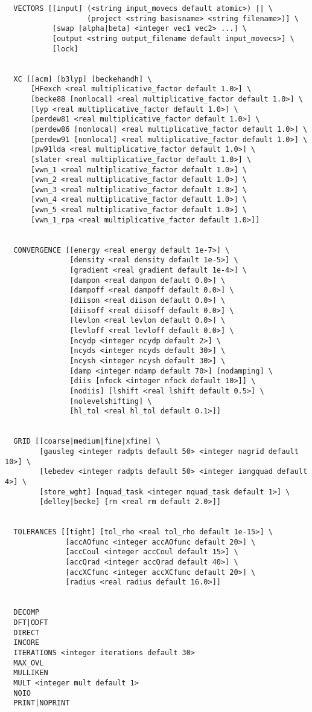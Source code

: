 \begin{verbatim}
  VECTORS [[input] (<string input_movecs default atomic>) || \
                   (project <string basisname> <string filename>)] \
           [swap [alpha|beta] <integer vec1 vec2> ...] \
           [output <string output_filename default input_movecs>] \
           [lock]


  XC [[acm] [b3lyp] [beckehandh] \
      [HFexch <real multiplicative_factor default 1.0>] \
      [becke88 [nonlocal] <real multiplicative_factor default 1.0>] \
      [lyp <real multiplicative_factor default 1.0>] \
      [perdew81 <real multiplicative_factor default 1.0>] \
      [perdew86 [nonlocal] <real multiplicative_factor default 1.0>] \
      [perdew91 [nonlocal] <real multiplicative_factor default 1.0>] \
      [pw91lda <real multiplicative_factor default 1.0>] \
      [slater <real multiplicative_factor default 1.0>] \
      [vwn_1 <real multiplicative_factor default 1.0>] \
      [vwn_2 <real multiplicative_factor default 1.0>] \
      [vwn_3 <real multiplicative_factor default 1.0>] \
      [vwn_4 <real multiplicative_factor default 1.0>] \
      [vwn_5 <real multiplicative_factor default 1.0>] \
      [vwn_1_rpa <real multiplicative_factor default 1.0>]]


  CONVERGENCE [[energy <real energy default 1e-7>] \
               [density <real density default 1e-5>] \
               [gradient <real gradient default 1e-4>] \
               [dampon <real dampon default 0.0>] \
               [dampoff <real dampoff default 0.0>] \
               [diison <real diison default 0.0>] \
               [diisoff <real diisoff default 0.0>] \
               [levlon <real levlon default 0.0>] \
               [levloff <real levloff default 0.0>] \
               [ncydp <integer ncydp default 2>] \
               [ncyds <integer ncyds default 30>] \
               [ncysh <integer ncysh default 30>] \
               [damp <integer ndamp default 70>] [nodamping] \
               [diis [nfock <integer nfock default 10>]] \
               [nodiis] [lshift <real lshift default 0.5>] \
               [nolevelshifting] \
               [hl_tol <real hl_tol default 0.1>]]


  GRID [[coarse|medium|fine|xfine] \
        [gausleg <integer radpts default 50> <integer nagrid default 10>] \ 
        [lebedev <integer radpts default 50> <integer iangquad default 4>] \ 
        [store_wght] [nquad_task <integer nquad_task default 1>] \
        [delley|becke] [rm <real rm default 2.0>]]
        

  TOLERANCES [[tight] [tol_rho <real tol_rho default 1e-15>] \
              [accAOfunc <integer accAOfunc default 20>] \
              [accCoul <integer accCoul default 15>] \
              [accQrad <integer accQrad default 40>] \
              [accXCfunc <integer accXCfunc default 20>] \
              [radius <real radius default 16.0>]]


  DECOMP
  DFT|ODFT
  DIRECT
  INCORE
  ITERATIONS <integer iterations default 30>
  MAX_OVL
  MULLIKEN
  MULT <integer mult default 1>
  NOIO
  PRINT|NOPRINT
\end{verbatim}

